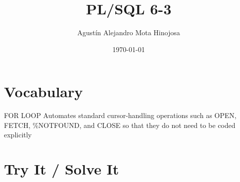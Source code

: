 \documentclass[11pt]{article}
\author{Agustín Alejandro Mota Hinojosa}
\date{\today}
\title{PL/SQL 6-3}
\begin{document}
\maketitle
\tableofcontents

\section{Vocabulary}
\label{sec:org7a0cc1a}

FOR LOOP Automates standard cursor-handling operations such as OPEN, FETCH, \%NOTFOUND, and CLOSE so that they do not need to be coded explicitly
\section{Try It / Solve It}
\label{sec:org50149d1}
\end{document}

